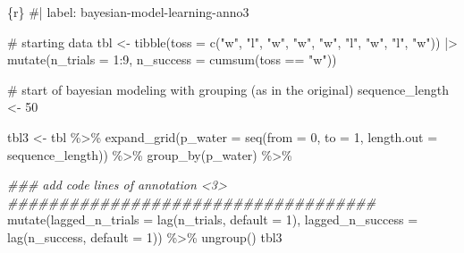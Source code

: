 \documentclass[
  letterpaper,
  DIV=11,
  numbers=noendperiod]{scrreprt}
\newenvironment{Shaded}{\begin{snugshade}}{\end{snugshade}}
\newcommand{\AttributeTok}[1]{\textcolor[rgb]{0.40,0.45,0.13}{#1}}
\newcommand{\CommentTok}[1]{\textcolor[rgb]{0.37,0.37,0.37}{#1}}
\newcommand{\DecValTok}[1]{\textcolor[rgb]{0.68,0.00,0.00}{#1}}
\newcommand{\DocumentationTok}[1]{\textcolor[rgb]{0.37,0.37,0.37}{\textit{#1}}}
\newcommand{\FunctionTok}[1]{\textcolor[rgb]{0.28,0.35,0.67}{#1}}
\newcommand{\InformationTok}[1]{\textcolor[rgb]{0.37,0.37,0.37}{#1}}
\newcommand{\NormalTok}[1]{\textcolor[rgb]{0.00,0.23,0.31}{#1}}
\newcommand{\OtherTok}[1]{\textcolor[rgb]{0.00,0.23,0.31}{#1}}
\newcommand{\SpecialCharTok}[1]{\textcolor[rgb]{0.37,0.37,0.37}{#1}}
\newcommand{\StringTok}[1]{\textcolor[rgb]{0.13,0.47,0.30}{#1}}
\begin{document}
\begin{Shaded}
\begin{Highlighting}[]
\InformationTok{\textasciigrave{}\textasciigrave{}\textasciigrave{}\{r\}}
\CommentTok{\#| label: bayesian{-}model{-}learning{-}anno3}

\CommentTok{\# starting data}
\NormalTok{tbl }\OtherTok{\textless{}{-}} \FunctionTok{tibble}\NormalTok{(}\AttributeTok{toss =} \FunctionTok{c}\NormalTok{(}\StringTok{"w"}\NormalTok{, }\StringTok{"l"}\NormalTok{, }\StringTok{"w"}\NormalTok{, }\StringTok{"w"}\NormalTok{, }\StringTok{"w"}\NormalTok{, }\StringTok{"l"}\NormalTok{, }\StringTok{"w"}\NormalTok{, }\StringTok{"l"}\NormalTok{, }\StringTok{"w"}\NormalTok{)) }\SpecialCharTok{|\textgreater{}} 
    \FunctionTok{mutate}\NormalTok{(}\AttributeTok{n\_trials  =} \DecValTok{1}\SpecialCharTok{:}\DecValTok{9}\NormalTok{, }\AttributeTok{n\_success =} \FunctionTok{cumsum}\NormalTok{(toss }\SpecialCharTok{==} \StringTok{"w"}\NormalTok{))}

\CommentTok{\# start of bayesian modeling with grouping (as in the original)}
\NormalTok{sequence\_length }\OtherTok{\textless{}{-}} \DecValTok{50}

\NormalTok{tbl3 }\OtherTok{\textless{}{-}}\NormalTok{ tbl }\SpecialCharTok{\%\textgreater{}\%} 
  \FunctionTok{expand\_grid}\NormalTok{(}\AttributeTok{p\_water =} \FunctionTok{seq}\NormalTok{(}\AttributeTok{from =} \DecValTok{0}\NormalTok{, }\AttributeTok{to =} \DecValTok{1}\NormalTok{, }
                            \AttributeTok{length.out =}\NormalTok{ sequence\_length)) }\SpecialCharTok{\%\textgreater{}\%} 
  \FunctionTok{group\_by}\NormalTok{(p\_water) }\SpecialCharTok{\%\textgreater{}\%} 
    
  \DocumentationTok{\#\#\# add code lines of annotation \textless{}3\textgreater{} \#\#\#\#\#\#\#\#\#\#\#\#\#\#\#\#\#\#\#\#\#\#\#\#\#\#\#\#\#\#\#\#\#\#\#\#}
  \FunctionTok{mutate}\NormalTok{(}\AttributeTok{lagged\_n\_trials  =} \FunctionTok{lag}\NormalTok{(n\_trials, }\AttributeTok{default =} \DecValTok{1}\NormalTok{),}
         \AttributeTok{lagged\_n\_success =} \FunctionTok{lag}\NormalTok{(n\_success, }\AttributeTok{default =} \DecValTok{1}\NormalTok{)) }\SpecialCharTok{\%\textgreater{}\%} 
  \FunctionTok{ungroup}\NormalTok{()}
\NormalTok{tbl3}
\InformationTok{\textasciigrave{}\textasciigrave{}\textasciigrave{}}
\end{Highlighting}
\end{Shaded}
\end{document}
